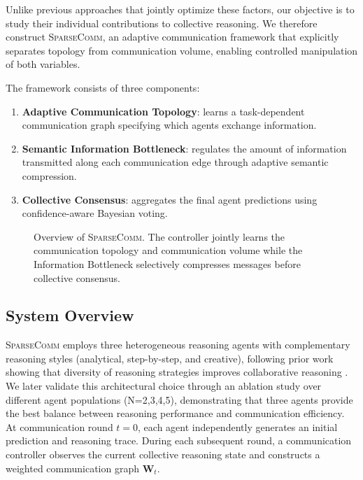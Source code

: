 \documentclass[11pt]{article}
\newcommand{\sys}{\textsc{SparseComm}\xspace}
\begin{document}
Unlike previous approaches that jointly optimize these factors, our objective is to study their individual contributions to collective reasoning. We therefore construct \sys{}, an adaptive communication framework that explicitly separates topology from communication volume, enabling controlled manipulation of both variables.

The framework consists of three components:

\begin{enumerate}
    \item \textbf{Adaptive Communication Topology}: learns a task-dependent communication graph specifying which agents exchange information.
    \item \textbf{Semantic Information Bottleneck}: regulates the amount of information transmitted along each communication edge through adaptive semantic compression.
    \item \textbf{Collective Consensus}: aggregates the final agent predictions using confidence-aware Bayesian voting.
\end{enumerate}

\begin{figure}[t]
    \centering
    \caption{Overview of \sys{}. The controller jointly learns the communication topology and communication volume while the Information Bottleneck selectively compresses messages before collective consensus.}
    \label{fig:overview}
\end{figure}

\subsection{System Overview}

\sys{} employs three heterogeneous reasoning agents with complementary reasoning styles (analytical, step-by-step, and creative), following prior work showing that diversity of reasoning strategies improves collaborative reasoning \citep{du2024improving,liang-etal-2024-encouraging,liu2025breaking}. We later validate this architectural choice through an ablation study over different agent populations (N={2,3,4,5}), demonstrating that three agents provide the best balance between reasoning performance and communication efficiency. At communication round $t=0$, each agent independently generates an initial prediction and reasoning trace. During each subsequent round, a communication controller observes the current collective reasoning state and constructs a weighted communication graph $\mathbf{W}_t$.
\end{document}
